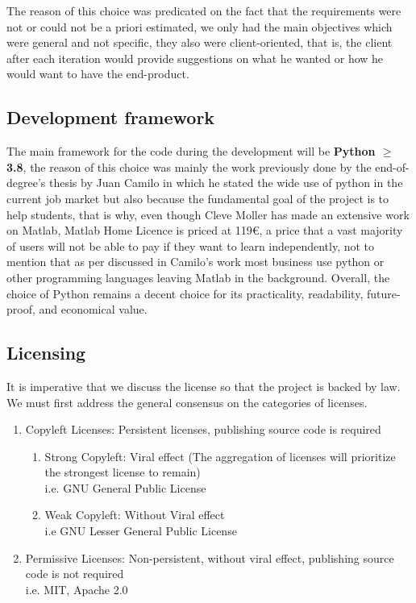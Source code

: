 The reason of this choice was predicated on the fact that the requirements were not or could not be a priori estimated, we only had the main objectives which were general and not specific, they also were client-oriented, that is, the client after each iteration would provide suggestions on what he wanted or how he would want to have the end-product.

\subsection{Development framework}
The main framework for the code during the development will be \textbf{Python $\ge$ 3.8}, the reason of this choice was mainly the work previously done by the end-of-degree's thesis by Juan Camilo in which he stated the wide use of python in the current job market but also because the fundamental goal of the project is to help students, that is why, even though Cleve Moller has made an extensive work on Matlab, Matlab Home Licence is priced at 119€, a price that a vast majority of users will not be able to pay if they want to learn independently, not to mention that as per discussed in Camilo's work most business use python or other programming languages leaving Matlab in the background. Overall, the choice of Python remains a decent choice for its practicality, readability, future-proof, and economical value.

\subsection{Licensing}
It is imperative that we discuss the license so that the project is backed by law. We must first address the general consensus on the categories of licenses.
\begin{enumerate}
    \item Copyleft Licenses: Persistent licenses, publishing source code is required
        \begin{enumerate}
            \item Strong Copyleft: Viral effect (The aggregation of licenses will prioritize the strongest license to remain)\\
            i.e. GNU General Public License
            \item Weak Copyleft: Without Viral effect\\
            i.e GNU Lesser General Public License
        \end{enumerate}
    \item Permissive Licenses: Non-persistent, without viral effect, publishing source code is not required\\
    i.e. MIT, Apache 2.0
\end{enumerate}

